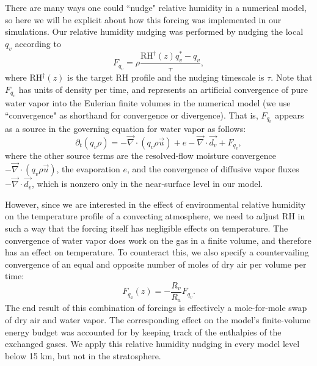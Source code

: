 \documentclass[draft,grl]{agutexSI}
\begin{document}
\begin{article}
There are many ways one could ``nudge" relative humidity in a numerical model, so here we will be explicit about how this forcing was implemented in our simulations. Our relative humidity nudging was performed by nudging the local $q_v$ according to
\begin{equation}
F_{q_v} = \rho \frac{\textrm{RH}^\dagger(z) q^*_v - q_v}{\tau},
\end{equation}
\noindent where RH$^\dagger(z)$ is the target RH profile and the nudging timescale is $\tau$. Note that $F_{q_v}$ has units of density per time, and represents an artificial convergence of pure water vapor into the Eulerian finite volumes in the numerical model (we use  ``convergence" as shorthand for convergence or divergence). That is, $F_{q_v}$ appears as a source in the governing equation for water vapor as follows:
\begin{equation}
\partial_t\left(q_v \rho\right) = -\vec{\nabla} \cdot \left(q_v \rho \vec{u}\right) + e - \vec{\nabla} \cdot \vec{d_v} + F_{q_v},
\end{equation}
\noindent where the other source terms are the resolved-flow moisture convergence $-\vec{\nabla} \cdot \left(q_v \rho \vec{u}\right)$, the evaporation $e$, and the convergence of diffusive vapor fluxes $-\vec{\nabla} \cdot \vec{d_v}$, which is nonzero only in the near-surface level in our model.

However, since we are interested in the effect of environmental relative humidity on the temperature profile of a convecting atmosphere, we need to adjust RH in such a way that the forcing itself has negligible effects on temperature. The convergence of water vapor does work on the gas in a finite volume, and therefore has an effect on temperature. To counteract this, we also specify a countervailing convergence of an equal and opposite number of moles of dry air per volume per time:
\begin{equation}
F_{q_a}(z) = -\frac{R_v}{R_a}F_{q_v}.
\end{equation}
\noindent The end result of this combination of forcings is effectively a mole-for-mole swap of dry air and water vapor. The corresponding effect on the model's finite-volume energy budget was accounted for by keeping track of the enthalpies of the exchanged gases. We apply this relative humidity nudging in every model level below 15 km, but not in the stratosphere.


\end{article}
\end{document}
